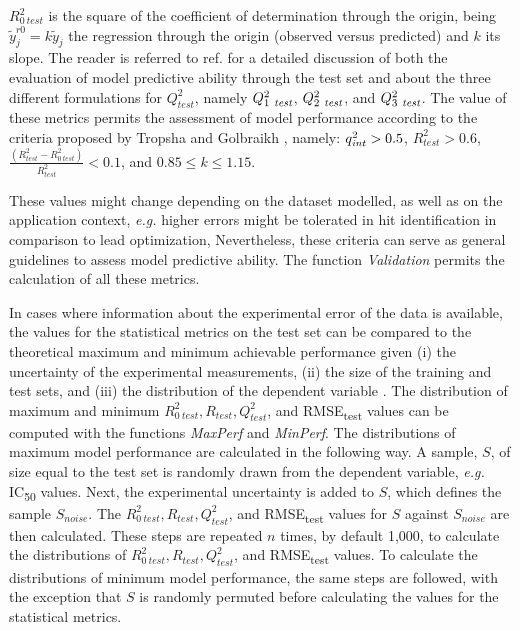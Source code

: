 \documentclass{bmcart}
\begin{document}
$R_{0\ test}^2$ is the square of the coefficient of determination through the origin, being $\widetilde{y}_{j}^{ r0} = k \widetilde{y}_j$ the regression through the origin (observed versus predicted) and $k$ its slope.
The reader is referred to ref. \cite{consonni} for a detailed discussion of both the evaluation of model predictive ability through the test set and about the three different formulations for $Q^{2}_{test}$, namely $Q_{1\ {\it test}}^{2}$, $Q_{2\ {\it test}}^{2}$, and $Q_{3\ {\it test}}^{2}$. 
The value of these metrics permits the assessment of model performance according to the criteria proposed by Tropsha and Golbraikh \cite{beware,earnest},
namely:
$q_{{\it int}}^{2} > 0.5$,
$R_{test}^2 > 0.6$,
$ \frac {(R_{test}^2 - R_{0\ test}^2)} {R_{test}^2} < 0.1$, and
$0.85 \leq k \leq 1.15$.

These values might change depending on the dataset modelled, as
well as on the application context, {\it e.g.} higher errors might be tolerated 
in hit identification in comparison to lead optimization,
Nevertheless, these criteria can serve as general guidelines to assess model predictive ability.
The function {\it Validation} permits the calculation of all these metrics.

In cases where information about the experimental error of the data is available,
the values for the statistical metrics on the test set
can be compared to the theoretical maximum and minimum achievable performance given 
(i) the uncertainty of the experimental measurements,
(ii) the size of the training and test sets,
and (iii) the distribution of the dependent variable \cite{cortesGP}.
The distribution of maximum and minimum $R_{0\ test}^2, R_{test}, Q^{2}_{test}$, and RMSE\textsubscript{test} 
values can be computed with the functions {\it MaxPerf} and {\it MinPerf}.
The distributions of maximum model performance are calculated in the following way.
A sample, $S$, of size equal to the test set is randomly drawn from the dependent variable, {\it e.g.} IC\textsubscript{50} values.
Next, the experimental uncertainty is added to $S$, 
which defines the sample $S_{noise}$.
The $R_{0\ test}^2, R_{test}, Q^{2}_{test}$, and RMSE\textsubscript{test} values
for $S$ against $S_{noise}$ are then calculated.
These steps are repeated $n$ times, by default 1,000, to calculate
the distributions of $R_{0\ test}^2, R_{test}, Q^{2}_{test}$, and RMSE\textsubscript{test} values.
To calculate the distributions of minimum model performance,
the same steps are followed, with the exception that $S$ is randomly
permuted before calculating the values for the statistical metrics.
\end{document}

